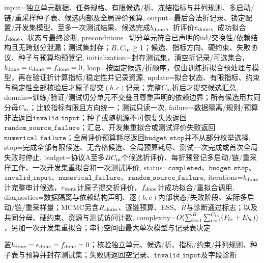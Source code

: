 \begin{AlgorithmContract}{
  input={独立单元数据、任务规格、有限候选/折、冻结指标与并列规则、多启动/链/重采样种子表、候选内部及全局评价预算},
  output={最后合法折记录、锁定配置/开发集模型、至多一次测试结果、候选完成$b_{\rm done}$、折评价$e_{\rm done}$、成功拟合$f_{\rm done}$、状态与最终诊断},
  preconditions={切分单元符合已声明的iid/交换性/依赖结构且无跨划分泄漏；测试集封存；$B,C_{\rm in}\ge1$；候选、指标方向、硬约束、失败协议、种子与预算均预登记},
  initialization={封存测试集，清空折记录/可选集合，$b_{\rm done}=e_{\rm done}=f_{\rm done}=0$},
  loop={按固定候选/折顺序，仅由训练折拟合预处理与模型，再在验证折计算指标/稳定性并记录资源},
  update={拟合状态、有限指标、约束与稳定性全部核验后才原子提交$(b,c)$记录；完整$C_{\rm in}$折后才提交候选汇总},
  domain={训练/验证/测试切分单元不交叠且尊重声明的依赖边界；所有候选用共同分母$C_{\rm in}$；比较指标有限且方向统一；测试只读一次},
  failure={数据隔离/规则/预算非法返回$\mathtt{invalid\_input}$；种子或随机源不可恢复失败返回$\mathtt{random\_source\_failure}$；汇总、开发集重拟合或测试评价失败返回$\mathtt{numerical\_failure}$；全局评价预算耗尽返回$\mathtt{budget\_stop}$并不从部分枚举选择},
  stop={完成全部有限候选、无合格候选、全局预算耗尽、测试一次完成或首次全局失败时停止},
  budget={协议A至多$BC_{\rm in}$个候选折评价、每折预登记多启动/链/重采样工作、一次开发集重拟合和一次测试评价},
  status={$\mathtt{completed}$、$\mathtt{budget\_stop}$、$\mathtt{invalid\_input}$、$\mathtt{numerical\_failure}$、$\mathtt{random\_source\_failure}$},
  iterations={$b_{\rm done}$计完整审计候选，$e_{\rm done}$计原子提交折评价，$f_{\rm done}$计成功拟合/重拟合调用},
  diagnostics={数据隔离与依赖结构声明、逐$(b,c)$内部状态/失败阶段、实际多启动/链/重采样量；MCMC另含$R_{\rm chain}$、逐链预算、ESS、$\widehat R$与诊断通过标志；以及共同分母、硬约束、资源与测试访问计数},
  complexity={$O(\sum_{b=1}^{B}\sum_{c=1}^{C_{\rm in}}(F_{bc}+E_{bc}))$，另加一次开发集重拟合；串行空间由最大单次模型与记录表决定}
}
\begin{algorithm}[tbp]
\caption{协议A：开发集选择与一次锁定测试}\label{alg:V5-C08-selection-protocol}
置$b_{\rm done}=e_{\rm done}=f_{\rm done}=0$；核验独立单元、候选/折、指标/约束/并列规则、种子表与预算并封存测试集；失败则返回空记录、$\mathtt{invalid\_input}$及字段诊断\;

\end{algorithm}
\end{AlgorithmContract}
